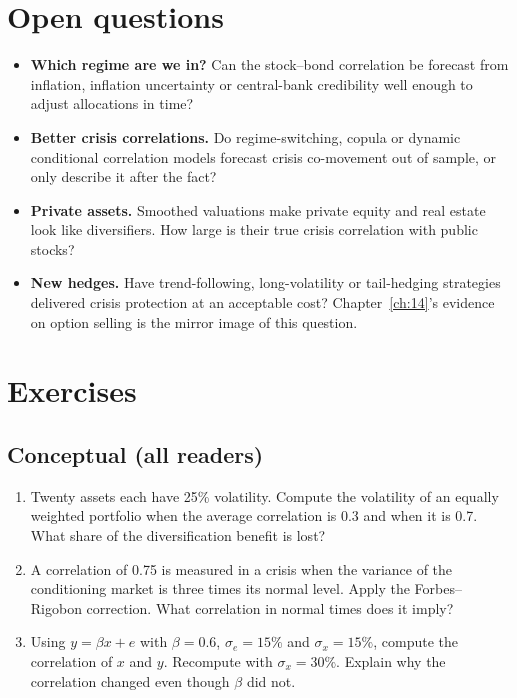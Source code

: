 \section{Open questions}
\label{sec:20-open}

\begin{itemize}
  \item \textbf{Which regime are we in?} Can the stock--bond correlation be forecast from inflation, inflation uncertainty or central-bank credibility well enough to adjust allocations in time?
  \item \textbf{Better crisis correlations.} Do regime-switching, copula or dynamic conditional correlation models forecast crisis co-movement out of sample, or only describe it after the fact?
  \item \textbf{Private assets.} Smoothed valuations make private equity and real estate look like diversifiers. How large is their true crisis correlation with public stocks?
  \item \textbf{New hedges.} Have trend-following, long-volatility or tail-hedging strategies delivered crisis protection at an acceptable cost? Chapter~\ref{ch:14}'s evidence on option selling is the mirror image of this question.
\end{itemize}

\section*{Exercises}

\subsection*{Conceptual (all readers)}

\begin{enumerate}
  \item Twenty assets each have 25\% volatility. Compute the volatility of an equally weighted portfolio when the average correlation is 0.3 and when it is 0.7. What share of the diversification benefit is lost?
  \item A correlation of 0.75 is measured in a crisis when the variance of the conditioning market is three times its normal level. Apply the Forbes--Rigobon correction. What correlation in normal times does it imply?
  \item Using $y = \beta x + e$ with $\beta = 0.6$, $\sigma_e = 15\%$ and $\sigma_x = 15\%$, compute the correlation of $x$ and $y$. Recompute with $\sigma_x = 30\%$. Explain why the correlation changed even though $\beta$ did not.
\end{enumerate}

